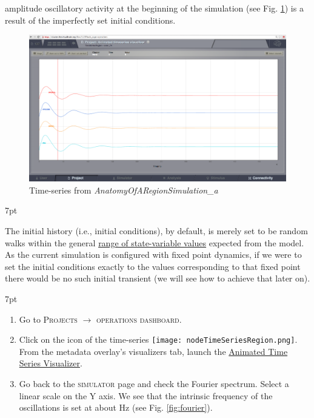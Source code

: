 \documentclass{tufte-handout}
\newenvironment{formal}{%
  \def\FrameCommand{%
    \hspace{1pt}%
    {\color{DarkBlue}\vrule width 2pt}%
    {\color{formalshade}\vrule width 4pt}%
    \colorbox{formalshade}%
  }%
  \MakeFramed{\advance\hsize-\width\FrameRestore}%
  \noindent\hspace{-4.55pt}%
  \begin{adjustwidth}{}{7pt}%
  \vspace{2pt}\vspace{2pt}%
}
{%
  \vspace{2pt}\end{adjustwidth}\endMakeFramed%
}
\newenvironment{blah}{%
  \def\FrameCommand{%
    \hspace{1pt}%
    {\color{DarkOrange}\vrule width 2pt}%
    {\color{PeachPuff}\vrule width 4pt}%
    \colorbox{PeachPuff}%
  }%
  \MakeFramed{\advance\hsize-\width\FrameRestore}%
  \noindent\hspace{-4.55pt}%
  \begin{adjustwidth}{}{7pt}%
  \vspace{2pt}\vspace{2pt}%
}
{%
  \vspace{2pt}\end{adjustwidth}\endMakeFramed%
}
\begin{document}
 amplitude oscillatory activity at the beginning of the
simulation (see Fig. \ref{fig:time_series}) is a result of the imperfectly set initial conditions.

\begin{figure}[h]
  \includegraphics[width=\linewidth]{Handout_UI_BuildingYourOwnBrainNetworkModel_AnimatedTimeSeries}%
  \caption{Time-series from \textit{AnatomyOfARegionSimulation\_a}}%
  \label{fig:time_series}%
\end{figure}
 
\begin{blah}
The initial history (i.e., initial conditions), by default, is merely set to be
random walks within the general \underline{range of state-variable values}
expected from the model.  As the current simulation is configured with fixed
point dynamics, if we were to set the initial conditions exactly to the values
corresponding to that fixed point there would be no such initial transient (we
will see how to achieve that later on).
\end{blah}


\begin{formal}
\begin{enumerate}
\item Go to \textsc{Projects} $\rightarrow$ \textsc{operations dashboard}.
\item Click on the icon of the time-series \texttt{[image: nodeTimeSeriesRegion.png]}. From the metadata overlay's visualizers tab, launch the \underline{Animated Time Series Visualizer}.
\item Go back to the \textsc{simulator} page and check the Fourier spectrum. Select a linear scale on the Y axis. We see that the intrinsic frequency of the oscillations is set at about \unit[11]{Hz} (see Fig. \ref{fig:fourier}). 
\end{enumerate}
\end{formal}
\end{document}
